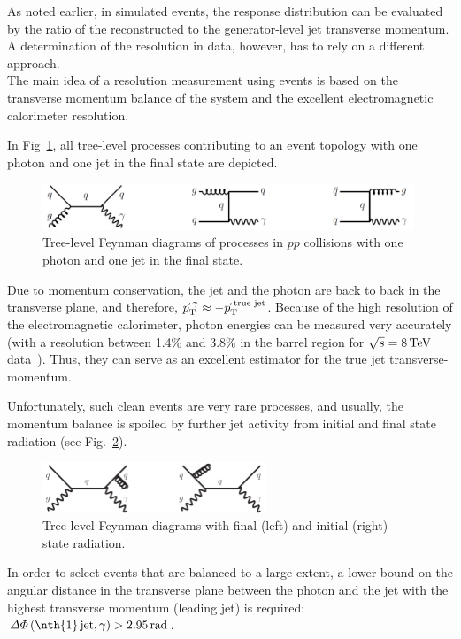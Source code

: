 As noted earlier, in simulated events, the response distribution can be evaluated by the ratio of the reconstructed to the generator-level jet transverse momentum.
A determination of the resolution in data, however, has to rely on a different approach.\\



The main idea of a resolution measurement using \GAMJET events is based on the transverse momentum balance of the \GAMJET system and the excellent electromagnetic calorimeter resolution.

In Fig~\ref{res:fig:FeynmanDiagrams}, all tree-level processes contributing to an event topology with one photon and one jet in the final state are depicted. 
\begin{figure}[b]
  \centering
      \includegraphics[width=0.99\textwidth]{figures/resolution/generalApproach/FeynmanDiagram.pdf}
  \caption{Tree-level Feynman diagrams of processes in $pp$ collisions with one photon and one jet in the final state.}  
  \label{res:fig:FeynmanDiagrams}
\end{figure}
Due to momentum conservation, the jet and the photon are back to back in the transverse plane, and therefore, $\vec{p}_{\text{T}}^{\,\,\gamma} \approx -\vec{p}_{\text{T}}^{\,\,\text{true jet}}$. 
Because of the high resolution of the electromagnetic calorimeter, photon energies can be measured very accurately (with a resolution between 1.4\% and 3.8\% in the barrel region for $\sqrt{s}=8\,\text{Te}\kern-0.06667em\text{V}$ data~\cite{bib:CMS:PhotonIdentification_8TeV}).
Thus, they can serve as an excellent estimator for the true jet transverse-momentum.


Unfortunately, such clean events are very rare processes, and usually, the momentum balance is spoiled by further jet activity from initial and final state radiation (see Fig.~\ref{res:fig:FeynmanDiagramsWithRadiation}). 
\begin{figure}[t]
  \centering
      \includegraphics[width=0.60\textwidth]{figures/resolution/generalApproach/FeynmanDiagramsWithRadiation.pdf}
  \caption{Tree-level Feynman diagrams with final (left) and initial (right) state radiation.}  
  \label{res:fig:FeynmanDiagramsWithRadiation}
\end{figure}
In order to select events that are balanced to a large extent, a lower bound on the angular distance in the transverse plane between the photon and the jet with the highest transverse momentum (leading jet) is required: $\Delta\Phi \left(\text{\nth{1}\,jet,\,} \gamma \right)>2.95\,\unit{rad}$. 

